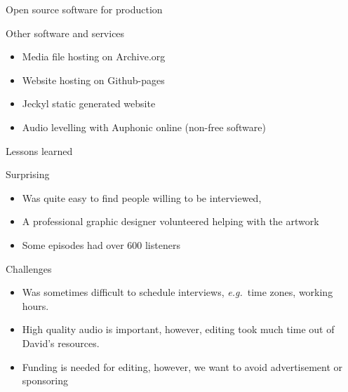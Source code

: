 \begin{frame}{Open source software for production}
\vspace{6pt}

Other software and services
\begin{itemize}
    \item Media file hosting on Archive.org
    \item Website hosting on Github-pages
    \item Jeckyl static generated website
    \item Audio levelling with Auphonic online (non-free software)
\end{itemize}

\end{frame}


\begin{frame}{Lessons learned}

\begin{block}{Surprising}
    \begin{itemize}
        \item Was quite easy to find people willing to be interviewed,
        \item A professional graphic designer volunteered helping with the artwork
        \item Some episodes had over 600 listeners
    \end{itemize}
\end{block}

\begin{block}{Challenges}
    \begin{itemize}
        \item Was sometimes difficult to schedule interviews, \emph{e.g.}\ time zones, working hours.
        \item High quality audio is important, however, editing took much time out of David's resources.
        \item Funding is needed for editing, however, we want to avoid advertisement or sponsoring
    \end{itemize}
\end{block}
    
\end{frame}
